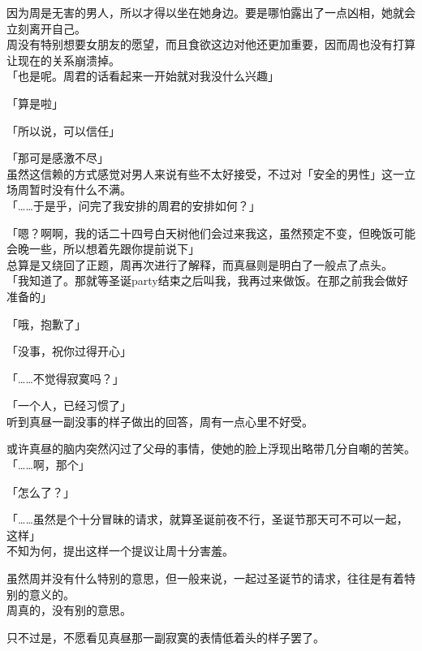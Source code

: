 因为周是无害的男人，所以才得以坐在她身边。要是哪怕露出了一点凶相，她就会立刻离开自己。\\

周没有特别想要女朋友的愿望，而且食欲这边对他还更加重要，因而周也没有打算让现在的关系崩溃掉。\\

「也是呢。周君的话看起来一开始就对我没什么兴趣」

「算是啦」

「所以说，可以信任」

「那可是感激不尽」\\

虽然这信赖的方式感觉对男人来说有些不太好接受，不过对「安全的男性」这一立场周暂时没有什么不满。\\

「……于是乎，问完了我安排的周君的安排如何？」

「嗯？啊啊，我的话二十四号白天树他们会过来我这，虽然预定不变，但晚饭可能会晚一些，所以想着先跟你提前说下」\\

总算是又绕回了正题，周再次进行了解释，而真昼则是明白了一般点了点头。\\

「我知道了。那就等圣诞party结束之后叫我，我再过来做饭。在那之前我会做好准备的」

「哦，抱歉了」

「没事，祝你过得开心」

「……不觉得寂寞吗？」

「一个人，已经习惯了」\\

听到真昼一副没事的样子做出的回答，周有一点心里不好受。

或许真昼的脑内突然闪过了父母的事情，使她的脸上浮现出略带几分自嘲的苦笑。\\

「……啊，那个」

「怎么了？」

「……虽然是个十分冒昧的请求，就算圣诞前夜不行，圣诞节那天可不可以一起，这样」\\

不知为何，提出这样一个提议让周十分害羞。

虽然周并没有什么特别的意思，但一般来说，一起过圣诞节的请求，往往是有着特别的意义的。\\

周真的，没有别的意思。

只不过是，不愿看见真昼那一副寂寞的表情低着头的样子罢了。\\

